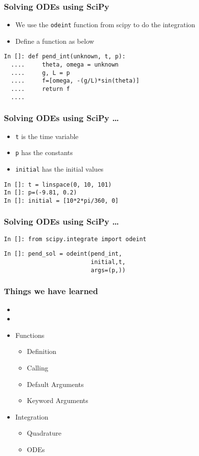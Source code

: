 \documentclass[14pt,compress]{beamer}
\newcounter{time}
\newcommand{\typ}[1]{\lstinline{#1}}
\begin{document}
\begin{frame}[fragile]
\frametitle{Solving ODEs using SciPy}
\begin{itemize}
\item We use the \typ{odeint} function from scipy to do the integration
\item Define a function as below
\end{itemize}
\begin{lstlisting}
In []: def pend_int(unknown, t, p):
  ....     theta, omega = unknown
  ....     g, L = p
  ....     f=[omega, -(g/L)*sin(theta)]
  ....     return f
  ....
\end{lstlisting}
\end{frame}

\begin{frame}[fragile]
\frametitle{Solving ODEs using SciPy \ldots}
\begin{itemize}
\item \typ{t} is the time variable \\ 
\item \typ{p} has the constants \\
\item \typ{initial} has the initial values
\end{itemize}
\begin{lstlisting}
In []: t = linspace(0, 10, 101)
In []: p=(-9.81, 0.2)
In []: initial = [10*2*pi/360, 0]
\end{lstlisting}
\end{frame}

\begin{frame}[fragile]
\frametitle{Solving ODEs using SciPy \ldots}

\small{\typ{In []: from scipy.integrate import odeint}}
\begin{lstlisting}
In []: pend_sol = odeint(pend_int, 
                         initial,t, 
                         args=(p,))
\end{lstlisting}
\end{frame}

\begin{frame}
  \frametitle{Things we have learned}
  \begin{itemize}
  \item
  \item
  \item Functions
    \begin{itemize}
    \item Definition
    \item Calling
    \item Default Arguments
    \item Keyword Arguments
    \end{itemize}
    \item Integration
    \begin{itemize}
      \item Quadrature
      \item ODEs
    \end{itemize}
  \end{itemize}
\end{frame}
\end{document}
